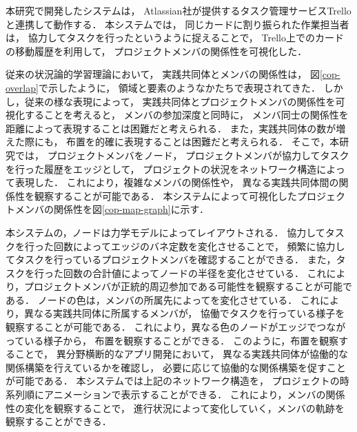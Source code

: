 

本研究で開発したシステムは，
Atlassian社が提供するタスク管理サービスTrelloと連携して動作する．
本システムでは，
同じカードに割り振られた作業担当者は，
協力してタスクを行ったというように捉えることで，
Trello上でのカードの移動履歴を利用して，
プロジェクトメンバの関係性を可視化した．

従来の状況論的学習理論において，
実践共同体とメンバの関係性は，
図\ref{cop-overlap}で示したように，
領域と要素のようなかたちで表現されてきた．
しかし，従来の様な表現によって，
実践共同体とプロジェクトメンバの関係性を可視化することを考えると，
メンバの参加深度と同時に，
メンバ同士の関係性を距離によって表現することは困難だと考えられる．
また，実践共同体の数が増えた際にも，
布置を的確に表現することは困難だと考えられる．
そこで，本研究では，
プロジェクトメンバをノード，
プロジェクトメンバが協力してタスクを行った履歴をエッジとして，
プロジェクトの状況をネットワーク構造によって表現した．
これにより，複雑なメンバの関係性や，
異なる実践共同体間の関係性を観察することが可能である．
本システムによって可視化したプロジェクトメンバの関係性を図\ref{cop-map-graph}に示す．

本システムの，ノードは力学モデルによってレイアウトされる．
協力してタスクを行った回数によってエッジのバネ定数を変化させることで，
頻繁に協力してタスクを行っているプロジェクトメンバを確認することができる．
また，タスクを行った回数の合計値によってノードの半径を変化させている．
これにより，プロジェクトメンバが正統的周辺参加である可能性を観察することが可能である．
ノードの色は，メンバの所属先によってを変化させている．
これにより，異なる実践共同体に所属するメンバが，
協働でタスクを行っている様子を観察することが可能である．
これにより，異なる色のノードがエッジでつながっている様子から，
布置を観察することができる．
このように，布置を観察することで，
異分野横断的なアプリ開発において，
異なる実践共同体が協働的な関係構築を行えているかを確認し，
必要に応じて協働的な関係構築を促すことが可能である．
本システムでは上記のネットワーク構造を，
プロジェクトの時系列順にアニメーションで表示することができる．
これにより，メンバの関係性の変化を観察することで，
進行状況によって変化していく，メンバの軌跡を観察することができる．

